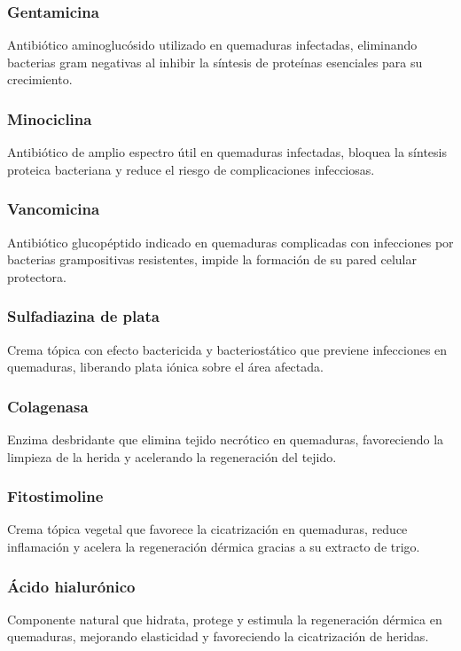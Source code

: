 \documentclass[../../DocumentoCompleto.tex]{subfiles}
\begin{document}
    \subsubsection{Gentamicina}
Antibiótico aminoglucósido utilizado en quemaduras infectadas, eliminando bacterias gram negativas al inhibir la síntesis de proteínas esenciales para su crecimiento. \cite{MarmolejoRuiz2025}

   \subsubsection{Minociclina}
Antibiótico de amplio espectro útil en quemaduras infectadas, bloquea la síntesis proteica bacteriana y reduce el riesgo de complicaciones infecciosas. \cite{DelgadoBeltran2022}


   \subsubsection{Vancomicina}
Antibiótico glucopéptido indicado en quemaduras complicadas con infecciones por bacterias grampositivas resistentes, impide la formación de su pared celular protectora. \cite{Teixeira2023}


   \subsubsection{Sulfadiazina de plata}
Crema tópica con efecto bactericida y bacteriostático que previene infecciones en quemaduras, liberando plata iónica sobre el área afectada. \cite{CardenasZuluaga2023}


   \subsubsection{Colagenasa}
Enzima desbridante que elimina tejido necrótico en quemaduras, favoreciendo la limpieza de la herida y acelerando la regeneración del tejido. \cite{MonteroUscanga2021}

   \subsubsection{Fitostimoline}
Crema tópica vegetal que favorece la cicatrización en quemaduras, reduce inflamación y acelera la regeneración dérmica gracias a su extracto de trigo. \cite{AjitimbayLopez2023}

   \subsubsection{Ácido hialurónico}
Componente natural que hidrata, protege y estimula la regeneración dérmica en quemaduras, mejorando elasticidad y favoreciendo la cicatrización de heridas. \cite{RituertoCuerdo2023} 
\end{document}
